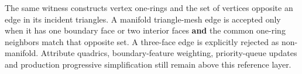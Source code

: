 The same witness constructs vertex one-rings and the set of vertices opposite an edge in its incident triangles. A manifold triangle-mesh edge is accepted only when it has one boundary face or two interior faces \textbf{and} the common one-ring neighbors match that opposite set. A three-face edge is explicitly rejected as non-manifold. Attribute quadrics, boundary-feature weighting, priority-queue updates and production progressive simplification still remain above this reference layer.
